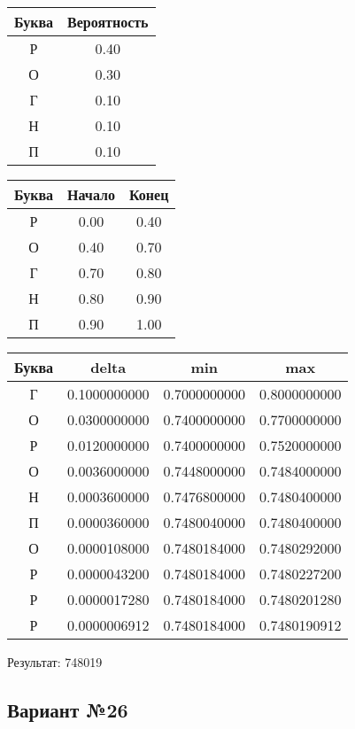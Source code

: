 \documentclass[a4paper, 12pt]{article}
\begin{document}
\begin{center}
 \begin{tabular}{ |c|c| } 
  \hline
     Буква & Вероятность \\ \hline
Р & 0.40\\\hline
О & 0.30\\\hline
Г & 0.10\\\hline
Н & 0.10\\\hline
П & 0.10
\\ \hline \end{tabular}
\end{center}
\begin{center}
 \begin{tabular}{ |c|c|c| } 
  \hline
     Буква & Начало & Конец \\ \hline
Р & 0.00 & 0.40\\\hline
О & 0.40 & 0.70\\\hline
Г & 0.70 & 0.80\\\hline
Н & 0.80 & 0.90\\\hline
П & 0.90 & 1.00
\\ \hline \end{tabular}
\end{center}
\begin{center}
 \begin{tabular}{ |c|c|c|c| } 
  \hline
     Буква & delta & min & max \\ \hline
Г & 0.1000000000 & 0.7000000000 & 0.8000000000\\\hline
О & 0.0300000000 & 0.7400000000 & 0.7700000000\\\hline
Р & 0.0120000000 & 0.7400000000 & 0.7520000000\\\hline
О & 0.0036000000 & 0.7448000000 & 0.7484000000\\\hline
Н & 0.0003600000 & 0.7476800000 & 0.7480400000\\\hline
П & 0.0000360000 & 0.7480040000 & 0.7480400000\\\hline
О & 0.0000108000 & 0.7480184000 & 0.7480292000\\\hline
Р & 0.0000043200 & 0.7480184000 & 0.7480227200\\\hline
Р & 0.0000017280 & 0.7480184000 & 0.7480201280\\\hline
Р & 0.0000006912 & 0.7480184000 & 0.7480190912
\\ \hline \end{tabular}
\end{center}
Результат: 748019
\pagebreak
\subsection{Вариант №26}
\end{document}
